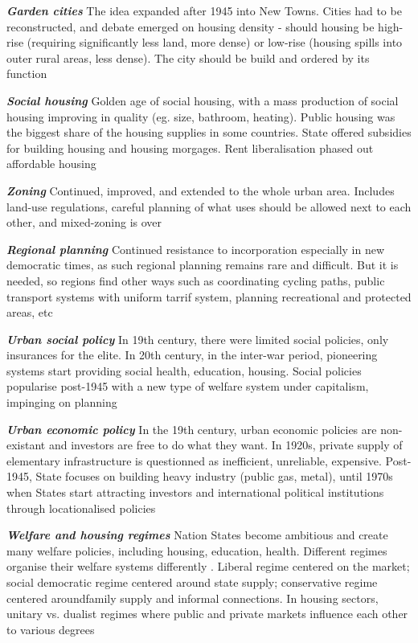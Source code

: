 \documentclass{article}
\newcommand{\bisection}[1]{\textbf{\textit{#1}}}
\newcommand{\alignedmarginpar}[1]{%
        \marginpar{\raggedright\small #1}
    }
\begin{document}
\bisection{Garden cities} The idea expanded after 1945 into New Towns. Cities had to be reconstructed, and debate emerged on housing density - should housing be high-rise (requiring significantly less land, more dense) or low-rise (housing spills into outer rural areas, less dense). The city should be build and ordered by its function

\bisection{Social housing} Golden age of social housing, with a mass production of social housing improving in quality (eg. size, bathroom, heating). Public housing was the biggest share of the housing supplies in some countries. State offered subsidies for building housing and housing morgages. Rent liberalisation phased out affordable housing

\bisection{Zoning} Continued, improved, and extended to the whole urban area. Includes land-use regulations, careful planning of what uses should be allowed next to each other, and mixed-zoning is over

\bisection{Regional planning} Continued resistance to incorporation especially in new democratic times, as such regional planning remains rare and difficult. But it is needed, so regions find other ways such as coordinating cycling paths, public transport systems with uniform tarrif system, planning recreational and protected areas, etc

\bisection{Urban social policy} In 19th century, there were limited social policies, only insurances for the elite. In 20th century, in the inter-war period, pioneering systems start providing social health, education, housing. Social policies popularise post-1945 with a new type of welfare system under capitalism, impinging on planning

\bisection{Urban economic policy} In the 19th century, urban economic policies are non-existant and investors are free to do what they want. In 1920s, private supply of elementary infrastructure is questionned as inefficient, unreliable, expensive. Post-1945, State focuses on building heavy industry (public gas, metal), until 1970s when States start attracting investors and international political institutions through locationalised policies\alignedmarginpar{UN City Vienna}

\bisection{Welfare and housing regimes} Nation States become ambitious and create many welfare policies, including housing, education, health. Different regimes organise their welfare systems differently\alignedmarginpar{Welfare triangle}. Liberal regime centered on the market; social democratic regime centered around state supply; conservative regime centered aroundfamily supply and informal connections. In housing sectors, unitary vs. dualist regimes where public and private markets influence each other to various degrees
\end{document}
